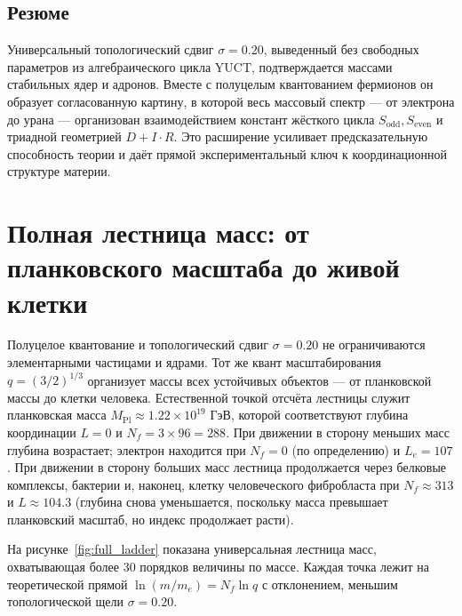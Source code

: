\documentclass[12pt,a4paper]{article}
\begin{document}
	\subsection{Резюме}
	
	Универсальный топологический сдвиг \(\sigma = 0.20\), выведенный без свободных параметров из алгебраического цикла YUCT, подтверждается массами стабильных ядер и адронов. Вместе с полуцелым квантованием фермионов он образует согласованную картину, в которой весь массовый спектр — от электрона до урана — организован взаимодействием констант жёсткого цикла \(S_{\mathrm{odd}}, S_{\mathrm{even}}\) и триадной геометрией \(D+I\cdot R\). Это расширение усиливает предсказательную способность теории и даёт прямой экспериментальный ключ к координационной структуре материи.
	
	\section{Полная лестница масс: от планковского масштаба до живой клетки}
	\label{sec:complete_ladder}
	
	Полуцелое квантование и топологический сдвиг \(\sigma = 0.20\) не ограничиваются элементарными частицами и ядрами. Тот же квант масштабирования \(q = (3/2)^{1/3}\) организует массы всех устойчивых объектов — от планковской массы до клетки человека. Естественной точкой отсчёта лестницы служит планковская масса \(M_{\mathrm{Pl}} \approx 1.22 \times 10^{19}\) ГэВ, которой соответствуют глубина координации \(L = 0\) и \(N_f = 3 \times 96 = 288\). При движении в сторону меньших масс глубина возрастает; электрон находится при \(N_f = 0\) (по определению) и \(L_e = 107\). При движении в сторону больших масс лестница продолжается через белковые комплексы, бактерии и, наконец, клетку человеческого фибробласта при \(N_f \approx 313\) и \(L \approx 104.3\) (глубина снова уменьшается, поскольку масса превышает планковский масштаб, но индекс продолжает расти).
	
	На рисунке~\ref{fig:full_ladder} показана универсальная лестница масс, охватывающая более 30 порядков величины по массе. Каждая точка лежит на теоретической прямой \(\ln(m/m_e) = N_f \ln q\) с отклонением, меньшим топологической щели \(\sigma = 0.20\).
	
\end{document}
